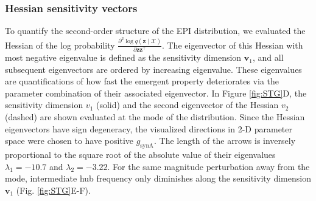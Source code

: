\documentclass[11pt]{article}
\begin{document}
\subsubsection{Hessian sensitivity vectors} \label{methods_stg_hessian}
To quantify the second-order structure of the EPI distribution, we evaluated the Hessian of the log probability $\frac{\partial^2 \log q(\mathbf{z} \mid \mathcal{X})}{\partial \mathbf{z} \mathbf{z}^\top}$.
The eigenvector of this Hessian with most negative eigenvalue is defined as the sensitivity dimension $\mathbf{v}_1$, and all subsequent eigenvectors are ordered by increasing eigenvalue.
These eigenvalues are quantifications of how fast the emergent property deteriorates via the parameter combination of their associated eigenvector.
In Figure \ref{fig:STG}D, the sensitivity dimension $v_1$ (solid) and the second eigenvector of the Hessian $v_2$ (dashed) are shown evaluated at the mode of the distribution.  
Since the Hessian eigenvectors have sign degeneracy, the visualized directions in 2-D parameter space were chosen to have positive $g_{\text{synA}}$.$  $
The length of the arrows is inversely proportional to the square root of the absolute value of their eigenvalues $\lambda_1 = -10.7$ and $\lambda_2 = -3.22$.
For the same magnitude perturbation away from the mode, intermediate hub frequency only diminishes along the sensitivity dimension $\mathbf{v}_1$ (Fig. \ref{fig:STG}E-F).
\end{document}
